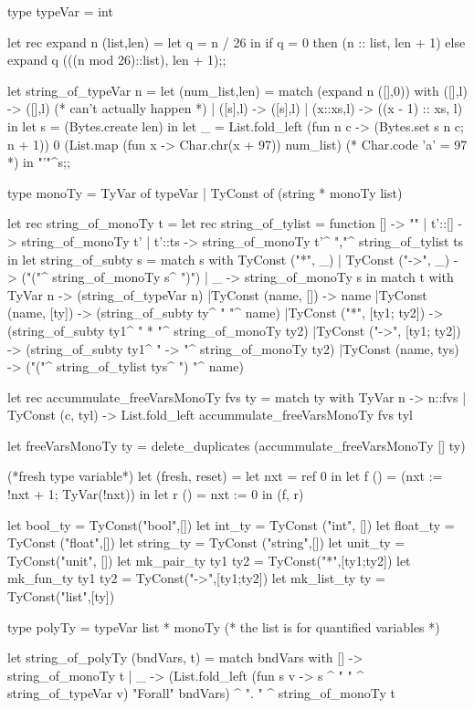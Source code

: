 type typeVar = int

let rec expand n (list,len) =
    let q = n / 26 in
        if q = 0 then (n :: list, len + 1)
        else expand q (((n mod 26)::list), len + 1);;

let string_of_typeVar n = 
   let (num_list,len) =
       match (expand n ([],0))
       with ([],l) -> ([],l) (* can't actually happen *)
          | ([s],l) -> ([s],l)
          | (x::xs,l) -> ((x - 1) :: xs, l)
   in
   let s = (Bytes.create len)
   in
   let _ =
    List.fold_left
    (fun n c -> (Bytes.set s n c; n + 1))
    0
    (List.map (fun x -> Char.chr(x + 97)) num_list)  (* Char.code 'a' = 97 *)
   in "'"^s;;

type monoTy = TyVar of typeVar | TyConst of (string * monoTy list)

let rec string_of_monoTy t =
  let rec string_of_tylist = function
     []     -> ""
   | t'::[] -> string_of_monoTy t'
   | t'::ts -> string_of_monoTy t'^ ","^ string_of_tylist ts
  in
  let string_of_subty s =
  match s with 
     TyConst ("*", _) | TyConst ("->", _) -> ("("^ string_of_monoTy s^ ")")
   | _ ->  string_of_monoTy s
  in 
    match t with
       TyVar n         -> (string_of_typeVar n)
     |TyConst (name, []) -> name
     |TyConst (name, [ty]) -> (string_of_subty ty^ " "^ name)
     |TyConst ("*", [ty1; ty2]) -> (string_of_subty ty1^ " * "^ string_of_monoTy ty2)
     |TyConst ("->", [ty1; ty2]) -> (string_of_subty ty1^ " -> "^ string_of_monoTy ty2)
     |TyConst (name, tys) -> ("("^ string_of_tylist tys^ ") "^ name)

let rec accummulate_freeVarsMonoTy fvs ty =
    match ty
    with TyVar n -> n::fvs
       | TyConst (c, tyl) -> List.fold_left accummulate_freeVarsMonoTy fvs tyl

let freeVarsMonoTy ty = delete_duplicates (accummulate_freeVarsMonoTy [] ty)

(*fresh type variable*)
let (fresh, reset) =
   let nxt = ref 0 in
   let f () = (nxt := !nxt + 1; TyVar(!nxt)) in
   let r () = nxt := 0 in
    (f, r)

let bool_ty = TyConst("bool",[])
let int_ty = TyConst ("int", [])
let float_ty = TyConst ("float",[])
let string_ty = TyConst ("string",[])
let unit_ty = TyConst("unit", [])
let mk_pair_ty ty1 ty2 = TyConst("*",[ty1;ty2])
let mk_fun_ty ty1 ty2 = TyConst("->",[ty1;ty2])
let mk_list_ty ty = TyConst("list",[ty])

type polyTy = typeVar list * monoTy  (* the list is for quantified variables *)

let string_of_polyTy (bndVars, t) = match bndVars with [] -> string_of_monoTy t
    | _ ->  (List.fold_left
             (fun s v -> s ^ " " ^ string_of_typeVar v)
             "Forall"
             bndVars)
             ^ ". " ^ string_of_monoTy t


